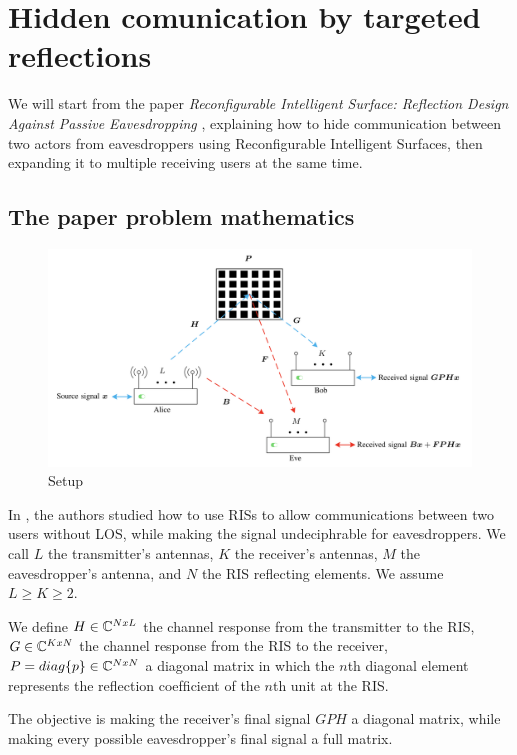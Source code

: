 \section{Hidden comunication by targeted reflections}

We will start from the paper \textit{Reconfigurable Intelligent Surface: Reflection Design Against Passive Eavesdropping} \cite{9328149}, explaining how to hide communication between two actors from eavesdroppers using Reconfigurable Intelligent Surfaces, then expanding it to multiple receiving users at the same time.

\subsection{The paper problem mathematics}

\begin{figure}[H]
  \centering
  \includegraphics[width=\linewidth]{imgs/problem-description.png}
  \caption{Setup}
  \label{fig:correlation_sk}
\end{figure}

In \cite{9328149}, the authors studied how to use RISs to allow communications between two users without LOS, while making the signal undeciphrable for eavesdroppers. We call $L$ the transmitter's antennas, $K$ the receiver's antennas, $M$ the eavesdropper's antenna, and $N$ the RIS reflecting elements. We assume $L \ge K \ge 2$.

We define $H \in \mathbb{C}^{NxL}$ the channel response from the transmitter to the RIS, $G \in \mathbb{C}^{KxN}$ the channel response from the RIS to the receiver, $P = diag\{p\} \in \mathbb{C}^{NxN}$ a diagonal matrix in which the $n$th diagonal element represents the reﬂection coefﬁcient of the $n$th unit at the RIS.

The objective is making the receiver's final signal $GPH$ a diagonal matrix, while making every possible eavesdropper's final signal a full matrix.

